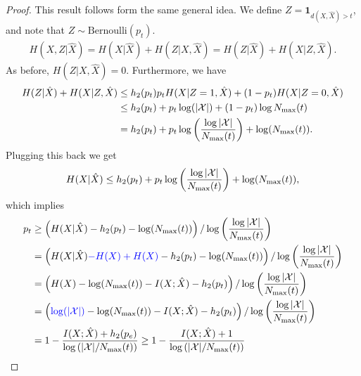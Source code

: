            \begin{proof}
                This result follows form the same general idea. We define $Z = \boldsymbol{1}_{d(X, \hat{X}) > t}$, and note that $Z \sim \text{Bernoulli}(p_t)$. 
                \begin{align}
                    H(X, Z|\hat{X}) = H(X|\hat{X}) + H(Z|X, \hat{X}) = H(Z|\hat{X}) + H(X|Z, \hat{X}). 
                \end{align}
                As before, $H(Z|X, \hat{X}) = 0$. Furthermore, we have 
                \begin{align}
                    H(Z|\hat{X}) + H(X|Z, \hat{X}) &\leq h_2(p_t) p_t H(X|Z=1, \hat{X}) + (1-p_t) H(X|Z=0, \hat{X}) \\ 
                    &\leq  h_2(p_t) + p_t \log(|\mathcal{X}|) + (1-p_t)  \log N_{\max}(t) \\
                    & = h_2(p_t) +  p_t \log \left( \frac{\log|\mathcal{X}|}{N_{\max}(t)} \right)   + \log(N_{\max}(t)). 
                \end{align}
                Plugging this back we get 
                \begin{align}
                    H(X|\hat{X}) \leq h_2(p_t) +  p_t \log \left( \frac{\log|\mathcal{X}|}{N_{\max}(t)} \right)   + \log(N_{\max}(t)), 
                \end{align}
                which implies 
                \begin{align}
                    p_t   &\geq \left( H(X|\hat{X}) - h_2(p_t) - \log(N_{\max}(t)) \right) /\log \left( \frac{\log|\mathcal{X}|}{N_{\max}(t)} \right) \\
                    & = \left( H(X|\hat{X})  \textcolor{blue}{- H(X) + H(X)} -  h_2(p_t) - \log(N_{\max}(t)) \right) /\log \left( \frac{\log|\mathcal{X}|}{N_{\max}(t)} \right) \\
                    & = \left( H(X) - \log(N_{\max}(t))- I(X; \hat{X}) -  h_2(p_t)  \right) /\log \left( \frac{\log|\mathcal{X}|}{N_{\max}(t)} \right) \\
                    & = \left( \textcolor{blue}{\log(|\mathcal{X}|)} - \log(N_{\max}(t))- I(X; \hat{X}) -  h_2(p_t)  \right) /\log \left( \frac{\log|\mathcal{X}|}{N_{\max}(t)} \right) \\
                    & = 1 - \frac{I(X;\hat{X}) + h_2(p_e)}{ \log \left( |\mathcal{X}|/N_{\max}(t) \right)}  \geq 
                    1 - \frac{I(X;\hat{X}) + 1}{ \log \left( |\mathcal{X}|/N_{\max}(t) \right)} 
                \end{align}
            \end{proof}


